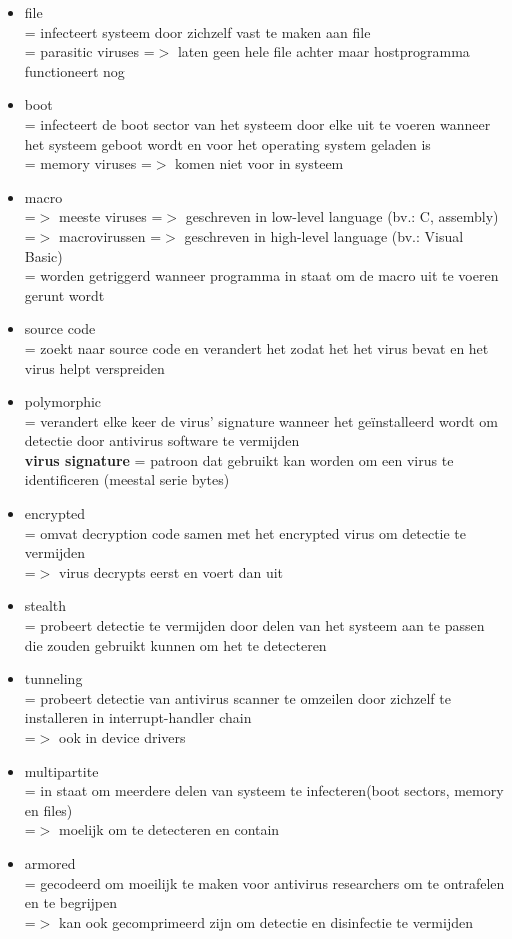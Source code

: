 \documentclass{report}
\begin{document}
\begin{itemize}
\item file
\\= infecteert systeem door zichzelf vast te maken aan file
\\= parasitic viruses =$>$ laten geen hele file achter maar hostprogramma functioneert nog
\item boot 
\\= infecteert de boot sector van het systeem door elke uit te voeren wanneer het systeem geboot wordt en voor het operating system geladen is
\\= memory viruses =$>$ komen niet voor in systeem
\item macro 
\\ =$>$ meeste viruses =$>$ geschreven in low-level language (bv.: C, assembly)
\\ =$>$ macrovirussen =$>$ geschreven in high-level language (bv.: Visual Basic)
\\ = worden getriggerd wanneer programma in staat om de macro uit te voeren gerunt wordt
\item source code
\\= zoekt naar source code en verandert het zodat het het virus bevat en het virus helpt verspreiden
\item polymorphic
\\= verandert elke keer de virus' signature wanneer het ge\"installeerd wordt om detectie door antivirus software te vermijden
\\ \textbf{virus signature} = patroon dat gebruikt kan worden om een virus te identificeren (meestal serie bytes)
\item encrypted
\\= omvat decryption code samen met het encrypted virus om detectie te vermijden
\\=$>$ virus decrypts eerst en voert dan uit
\item stealth
\\ = probeert detectie te vermijden door delen van het systeem aan te passen die zouden gebruikt kunnen om het te detecteren
\item tunneling
\\ = probeert detectie van antivirus scanner te omzeilen door zichzelf te installeren in interrupt-handler chain
\\ =$>$ ook in device drivers
\item multipartite
\\= in staat om meerdere delen van systeem te infecteren(boot sectors, memory en files)
\\=$>$ moelijk om te detecteren en contain
\item armored
\\= gecodeerd om moeilijk te maken voor antivirus researchers om te ontrafelen en te begrijpen
\\=$>$ kan ook gecomprimeerd zijn om detectie en disinfectie te vermijden
\end{itemize}
\end{document}
